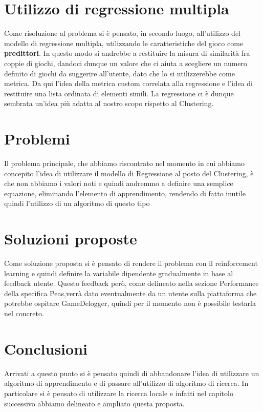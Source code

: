 \section{Utilizzo di regressione multipla}
Come risoluzione al problema si è pensato, in secondo luogo, all'utilizzo del modello di regressione multipla, utilizzando le caratteristiche del gioco come \textbf{predittori}. In questo modo si andrebbe a restituire la misura di similarità fra coppie di giochi, dandoci dunque un valore che ci aiuta a scegliere un numero definito di giochi da suggerire all'utente, dato che lo si utilizzerebbe come metrica. Da qui l'idea della metrica custom correlata alla regressione e l'idea di restituire una lista ordinata di elementi simili. La regressione ci è dunque sembrata un'idea più adatta al nostro scopo rispetto al Clustering. 


\section{Problemi}
Il problema principale, che abbiamo riscontrato nel momento in cui abbiamo concepito l'idea di utilizzare il modello di Regressione al posto del Clustering, è che non abbiamo i valori noti e quindi andremmo a definire una semplice equazione, eliminando l'elemento di apprendimento, rendendo di fatto inutile quindi l'utilizzo di un algoritmo di questo tipo


\section{Soluzioni proposte}
Come soluzione proposta si è pensato di rendere il problema con il  reinforcement learning e quindi definire la variabile dipendente gradualmente in base al feedback utente. Questo feedback però, come delineato nella sezione Performance della specifica Peas,verrà dato eventualmente da un utente sulla piattaforma che potrebbe ospitare GameDelogger, quindi per il momento non è possibile testarla nel concreto.

\section{Conclusioni}
Arrivati a questo punto si è pensato quindi di abbandonare l'idea di utilizzare un algoritmo di apprendimento e di passare all'utilizzo di algoritmo di ricerca. In particolare si è pensato di utilizzare la ricerca locale e infatti nel capitolo successivo abbiamo delineato e ampliato questa proposta.